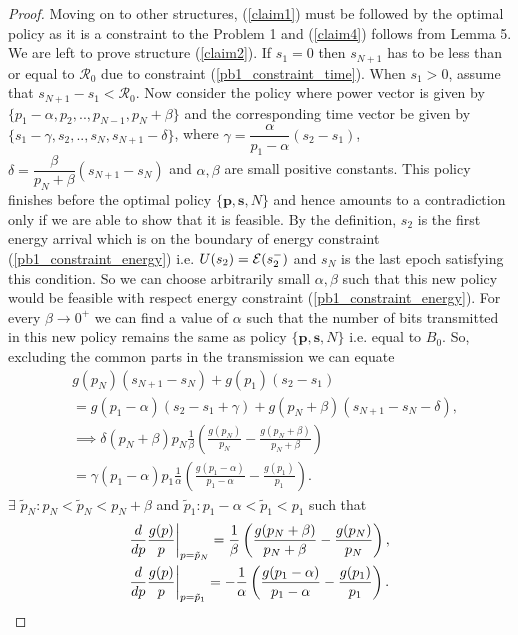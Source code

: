 \begin{proof}
Moving on to other structures, (\ref{claim1}) must be followed by the optimal policy as it is a constraint to the Problem 1 and (\ref{claim4}) follows from Lemma 5. We are left to prove structure (\ref{claim2}). If $s_1=0$ then $s_{N+1}$ has to be less than or equal to $\mathcal{R}_0$ due to constraint (\ref{pb1_constraint_time}). When $s_1>0$, assume that $s_{N+1}-s_1<\mathcal{R}_0$. Now consider the policy where power vector is given by $\{p_1-\alpha,p_2,..,p_{N-1},p_N+\beta \}$ and the corresponding time vector be given by $\{s_1-\gamma,s_2,..,s_{N},s_{N+1}-\delta\}$, where $\gamma=\dfrac{\alpha}{p_1-\alpha}(s_2-s_1)$, $\delta =\dfrac{\beta}{p_N+\beta}(s_{N+1}-s_N)$ and $\alpha ,\beta$ are small positive constants. This policy finishes before the optimal policy $\{\textbf{p},\textbf{s},N\}$ and hence amounts to a contradiction only if we are able to show that it is feasible. By the definition, $s_{2}$ is the first energy arrival which is on the boundary of energy constraint (\ref{pb1_constraint_energy}) i.e. $U(s_2)=\mathcal{E}(s_2^-)$ and $s_{N}$ is the last epoch satisfying this condition. So we can choose arbitrarily small $\alpha ,\beta$ such that this new policy would be feasible with respect energy constraint (\ref{pb1_constraint_energy}). For every $\beta\rightarrow 0^+$ we can find a value of $\alpha$ such that the number of bits transmitted in this new policy remains the same as policy $\{\textbf{p},\textbf{s},N\}$ i.e. equal to $B_0$. So, excluding the common parts in the transmission we can equate
\begin{align}
&g(p_N)(s_{N+1}-s_N)+g(p_1)(s_2-s_1)\nonumber
\\
&=g(p_1-\alpha)(s_2-s_1+\gamma)+g(p_N+\beta)(s_{N+1}-s_N-\delta)\nonumber,
\\
&\implies \delta(p_N+\beta)p_N\frac{1}{\beta}\left(\frac{g(p_N)}{p_N}-\frac{g(p_N+\beta)}{p_N+\beta}\right)\nonumber
\\
&=\gamma(p_1-\alpha)p_1\frac{1}{\alpha}\left(\frac{g(p_1-\alpha)}{p_1-\alpha}-\frac{g(p_1)}{p_1}\right).\label{bits_equal}
\end{align}
$\exists$ $\tilde{p}_N:p_N<\tilde{p}_N<p_{N}+\beta$ and $\tilde{p}_1:p_1-\alpha<\tilde{p}_1<p_{1}$ such that
\begin{align}
&\frac{d}{dp} \frac{g(p)}{p} \bigg{\vert}_{p=\tilde{p}_N}=\frac{1}{\beta}\left(\frac{g(p_N+\beta)}{p_N+\beta}-\frac{g(p_N)}{p_N}\right),\label{diff_1}
\\
&\frac{d}{dp} \frac{g(p)}{p}\bigg{\vert}_{p=\tilde{p}_1}=-\frac{1}{\alpha}\left(\frac{g(p_1-\alpha)}{p_1-\alpha}-\frac{g(p_1)}{p_1}\right)\label{diff_2}.

\end{align}
\end{proof}
